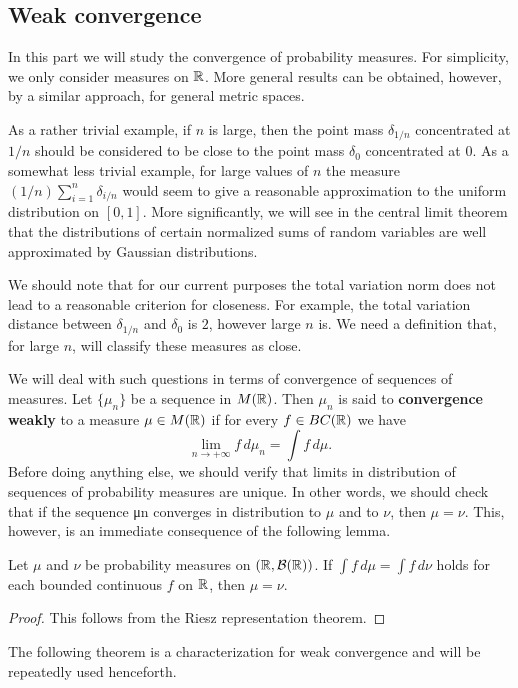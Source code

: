 \subsection{Weak convergence}
In this part we will study the convergence of probability measures. For simplicity, we only consider measures on $\mathbb{R}$. More general results can be obtained, however, by a similar approach, for general metric spaces.\par
As a rather trivial example, if $n$ is large, then the point mass $\delta_{1/n}$ concentrated at $1/n$ should be considered to be close to the point mass $\delta_0$ concentrated at $0$. As a somewhat less trivial example, for large values of $n$ the measure $(1/n)\sum_{i=1}^{n}\delta_{i/n}$ would seem to give a reasonable approximation to the uniform distribution on $[0,1]$. More significantly, we will see in the central limit theorem that the distributions of certain normalized sums of random variables are well
approximated by Gaussian distributions.\par
We should note that for our current purposes the total variation norm does not lead to a reasonable criterion for closeness. For example, the total variation distance between $\delta_{1/n}$ and $\delta_0$ is $2$, however large $n$ is. We need a definition that, for large $n$, will classify these measures as close.\par
We will deal with such questions in terms of convergence of sequences of measures. Let $\{\mu_n\}$ be a sequence in $M(\mathbb{R})$. Then $\mu_n$ is said to \textbf{convergence weakly} to a measure $\mu\in M(\mathbb{R})$ if for every $f\in BC(\mathbb{R})$ we have
\[\lim_{n\to+\infty}f\,d\mu_n=\int f\,d\mu.\]
Before doing anything else, we should verify that limits in distribution of
sequences of probability measures are unique. In other words, we should check that if the sequence {μn} converges in distribution to $\mu$ and to $\nu$, then $\mu=\nu$. This, however, is an immediate consequence of the following lemma.
\begin{lemma}
Let $\mu$ and $\nu$ be probability measures on $(\mathbb{R},\mathcal{B}(\mathbb{R}))$. If $\int f\,d\mu=\int f\,d\nu$ holds for each bounded continuous $f$ on $\mathbb{R}$, then $\mu=\nu$.
\end{lemma}
\begin{proof}
This follows from the Riesz representation theorem.
\end{proof}
The following theorem is a characterization for weak convergence and will be repeatedly used henceforth.
